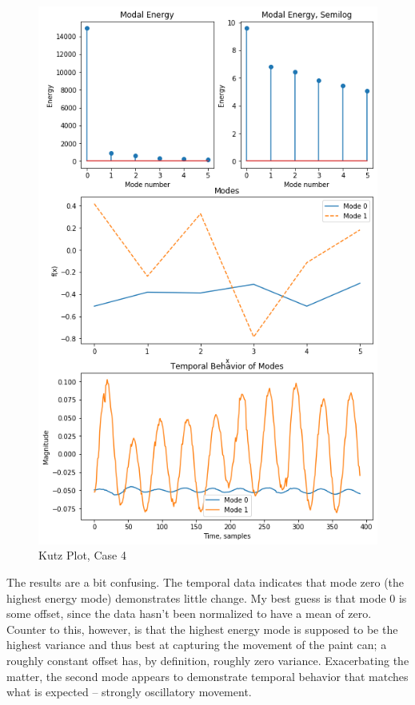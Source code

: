 \documentclass[journal]{IEEEtran}
\begin{document}
\begin{figure}
	\centerline{\includegraphics[width=\columnwidth]{kutz4.png}}
	\caption{Kutz Plot, Case 4}
	\label{kutz4}
\end{figure}

The results are a bit confusing. The temporal data indicates that mode zero (the highest energy mode) demonstrates little change. My best guess is that mode 0 is some offset, since the data hasn't been normalized to have a mean of zero. Counter to this, however, is that the highest energy mode is supposed to be the highest variance and thus best at capturing the movement of the paint can; a roughly constant offset has, by definition, roughly zero variance. Exacerbating the matter, the second mode appears to demonstrate temporal behavior that matches what is expected -- strongly oscillatory movement.
\end{document}
